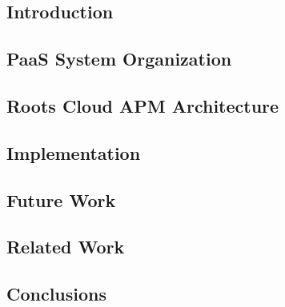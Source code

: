 \subsection{Introduction}


\subsection{PaaS System Organization}


\subsection{Roots Cloud APM Architecture}


\subsection{Implementation}


\subsection{Future Work}


\subsection{Related Work}


\subsection{Conclusions}

